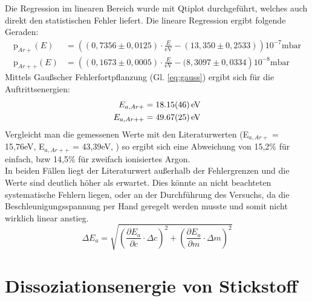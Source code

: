 Die Regression im linearen Bereich wurde mit Qtiplot durchgeführt, welches auch direkt den statistischen Fehler liefert. Die lineare Regression ergibt folgende Geraden:
\begin{align}
	\textrm{p}_{Ar+}(E) &= \left((0,7356\pm 0,0125)\cdot\frac{E}{\textrm{eV}} - (13,350\pm 0,2533)\right)10^{-7}\textrm{mbar}\\
	\textrm{p}_{Ar++}(E) &= \left((0,1673\pm 0,0005)\cdot\frac{E}{\textrm{eV}} - (8,3097\pm 0,0334\right)10^{-8}\textrm{mbar}
\end{align}
Mittels Gaußscher Fehlerfortpflanzung (Gl. \ref{eq:gauss}) ergibt sich für die Auftrittsenergien:
\begin{align}
	E_{a,Ar+} &= \SI{18,15\pm 0,46}{\electronvolt}\\
	E_{a,Ar++} &= \SI{49,67\pm 0,25}{\electronvolt}
\end{align}
Vergleicht man die gemessenen Werte mit den Literaturwerten (E$_{a,Ar+}$ = 15,76\;eV, E$_{a,Ar++}$ = 43,39\;eV, \cite{Litmap}) so ergibt sich eine Abweichung von 15,2\;\% für einfach, bzw 14,5\;\% für zweifach ionisiertes Argon.\\
In beiden Fällen liegt der Literaturwert außerhalb der Fehlergrenzen und die Werte sind deutlich höher als erwartet. Dies könnte an nicht beachteten systematische Fehlern liegen, oder an der Durchführung des Versuchs, da die Beschleunigungsspannung per Hand geregelt werden musste und somit nicht wirklich linear anstieg.\\
\begin{equation}
	\Delta E_a = \sqrt{\left(\frac{\partial E_a}{\partial c}\cdot\Delta c\right)^2 + \left(\frac{\partial E_a}{\partial m}\cdot\Delta m\right)^2}
	\label{eq:gauss}
\end{equation}

\section{Dissoziationsenergie von Stickstoff}

